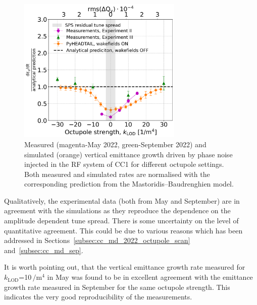 \begin{figure}[!h]
   \centering         
   \includegraphics[width=0.7\textwidth]{images/Ch8/deyRates_sps_270GeV_PN1e-8_400MHz_SPS_NewWakesAllcontributions_appendWakes_y-plane_WakesONvsOFF_QpxQpy1_6D_Nb5e5_intensity3e10Scan_simulations_vs_measurements_magenta_new_legend_IPAC22_May_and_September_2022_for_thesis.png}
       \caption{Measured (magenta-May 2022, green-September 2022) and simulated (orange) vertical emittance growth driven by phase noise injected in the RF system of CC1 for different octupole settings. Both measured and simulated rates are normalised with the corresponding prediction from the Mastoridis--Baudrenghien model.}
       \label{fig:cc_md_2022_measurement_vs_pyheadtail_simualtion_sep22}
\end{figure}

Qualitatively, the experimental data (both from May and September) are in agreement with the simulations as they reproduce the dependence on the amplitude dependent tune spread. There is some uncertainty on the level of quantitative agreement. This could be due to various reasons which has been addressed in Sections~\ref{subsec:cc_md_2022_octupole_scan} and~\ref{subsec:cc_md_sep}.

It is worth pointing out, that the vertical emittance growth rate measured for $k_\mathrm{LOD}$=10\,$\mathrm{/m^4}$ in May was found to be in excellent agreement with the emittance growth rate measured in September for the same octupole strength. This indicates the very good reproducibility of the measurements.

